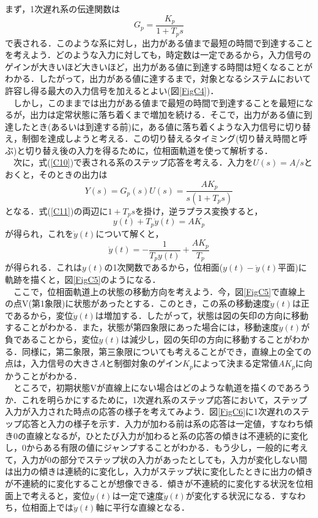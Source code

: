 \documentclass[12pt]{jsarticle}
\begin{document}
  まず，1次遅れ系の伝達関数は
\begin{equation}
\label{C10}
G_p = \frac{K_p}{1+T_ps}
\end{equation}
で表される．このような系に対し，出力がある値まで最短の時間で到達することを考えよう．どのような入力に対しても，時定数は一定であるから，入力信号のゲインが大きいほど大きいほど，出力がある値に到達する時間は短くなることがわかる．したがって，出力がある値に達するまで，対象となるシステムにおいて許容し得る最大の入力信号を加えるとよい(図\ref{FigC4})．\\
　しかし，このままでは出力がある値まで最短の時間で到達することを最短になるが，出力は定常状態に落ち着くまで増加を続ける．そこで，出力がある値に到達したとき(あるいは到達する前)に，ある値に落ち着くような入力信号に切り替え，制御を達成しようと考える．この切り替えるタイミング(切り替え時間と呼ぶ)と切り替え後の入力を得るために，位相面軌道を使って解析する．\\
　次に，式(\ref{C10})で表される系のステップ応答を考える．入力を$U(s)=A/s$とおくと，そのときの出力は
\begin{equation}
\label{C11}
Y(s) = G_p(s)U(s) = \frac{AK_p}{s(1+T_ps)}
\end{equation}
となる．式(\ref{C11})の両辺に$1+T_ps$を掛け，逆ラプラス変換すると，
\begin{equation}
\label{C12}
y(t) + T_p\dot{y}(t) = AK_p
\end{equation}
が得られ，これを$\dot{y}(t)$について解くと，
\begin{equation}
\label{C13}
\dot{y}(t) = -\frac{1}{T_py(t)} + \frac{AK_p}{T_p}
\end{equation}
が得られる．これは$y(t)$の1次関数であるから，位相面($y(t)-\dot{y}(t)$平面)に軌跡を描くと，図\ref{FigC5}のようになる．\\
　ここで，位相面軌道上の状態の移動方向を考えよう．今，図\ref{FigC5}で直線上の点V(第1象限)に状態があったとする．このとき，この系の移動速度$\dot{y}(t)$は正であるから，変位$\dot{y}(t)$は増加する．したがって，状態は図の矢印の方向に移動することがわかる．また，状態が第四象限にあった場合には，移動速度$\dot{y}(t)$が負であることから，変位$y(t)$は減少し，図の矢印の方向に移動することがわかる．同様に，第二象限，第三象限についても考えることができ，直線上の全ての点は，入力信号の大きさ$A$と制御対象のゲイン$K_p$によって決まる定常値$AK_p$に向かうことがわかる．\\
　ところで，初期状態Vが直線上にない場合はどのような軌道を描くのであろうか．これを明らかにするために，1次遅れ系のステップ応答において，ステップ入力が入力された時点の応答の様子を考えてみよう．図\ref{FigC6}に1次遅れのステップ応答と入力の様子を示す．入力が加わる前は系の応答は一定値，すなわち傾き0の直線となるが，ひとたび入力が加わると系の応答の傾きは不連続的に変化し，0からある有限の値にジャンプすることがわかる．もう少し，一般的に考えて，入力が0の部分でステップ状の入力があったとしても，入力が変化しない間は出力の傾きは連続的に変化し，入力がステップ状に変化したときに出力の傾きが不連続的に変化することが想像できる．傾きが不連続的に変化する状況を位相面上で考えると，変位$y(t)$は一定で速度$\dot{y}(t)$が変化する状況になる．すなわち，位相面上では$\dot{y}(t)$軸に平行な直線となる．\\
\end{document}
